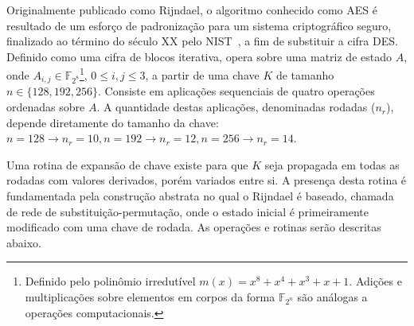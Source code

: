 \documentclass{ufsctex/ufsctex}
\begin{document}
Originalmente publicado como Rijndael, o algoritmo conhecido como
AES é resultado de um esforço
de padronização para um sistema criptográfico seguro, finalizado ao término do
século XX pelo NIST~\cite{Dworkin:report:2001:nov}, a fim de substituir a cifra
DES. Definido como uma cifra de
blocos iterativa, opera sobre uma matriz de estado $A$, onde $A_{i, j} \in
\mathbb{F}_{2^{8}}$\footnote{Definido pelo polinômio irredutível $m(x) = x^{8} + x^{4} + x^{3}
+ x + 1$. Adições e multiplicações sobre elementos em corpos da forma
$\mathbb{F}_{2^{n}}$ são análogas a operações computacionais.}, $0 \leq i, j
\leq 3$, a partir de uma chave $K$ de tamanho $n \in \{128, 192, 256\}$.
Consiste em aplicações sequenciais de quatro operações ordenadas sobre $A$. A
quantidade destas aplicações, denominadas rodadas ($n_{r}$), depende
diretamente do tamanho da chave: $n = 128 \rightarrow n_{r} = 10, n = 192
\rightarrow n_{r} = 12, n = 256 \rightarrow n_{r} = 14$.

Uma rotina de expansão de chave existe para que $K$ seja propagada em todas as
rodadas com valores derivados, porém variados entre si. A presença desta rotina
é fundamentada pela construção abstrata no qual o Rijndael é baseado, chamada
de rede de substituição-permutação, onde o estado inicial é primeiramente
modificado com uma chave de rodada. As operações e rotinas serão descritas
abaixo.
\end{document}
